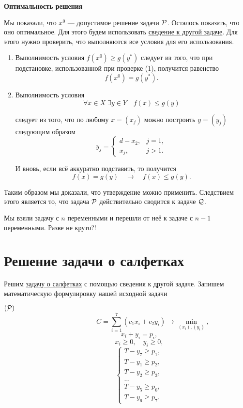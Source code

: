 \bigskip

\textbf{Оптимальность решения}

Мы показали, что $x^0$ --- допустимое решение задачи $\P$. Осталось показать, что оно оптимальное. Для этого будем использовать \hyperref[fact:reduction_to_other_problem]{сведение к другой задаче}. Для этого нужно проверить, что выполняются все условия для его использования.

\begin{enumerate}[nosep]
	\item Выполнимость условия $f(x^0) \ge g(y^*)$ следует из того, что при подстановке, использованной при проверке (1), получится равенство
	\[
	f(x^0) = g(y^*).
	\]
	
	\item Выполнимость условия
	\[
	\forall x \in X \; \exists y \in Y \quad f(x) \le g(y)
	\]
	
	следует из того, что по любому $x = (x_j)$ можно построить $y = (y_j)$ следующим образом
	\[
	y_j = \begin{cases}
		d - x_2,& j = 1, \\
		x_j,& j > 1.
	\end{cases}
	\]
	
	И вновь, если всё аккуратно подставить, то получится
	\[
	f(x) = g(y) \quad \rightarrow \quad f(x) \le g(y).
	\]
\end{enumerate}

Таким образом мы доказали, что утверждение можно применить. Следствием этого является то, что задача $\P$ действительно сводится к задаче $\Q$.

Мы взяли задачу с $n$ переменными и перешли от неё к задаче с $n-1$ переменными. Разве не круто?!

\section{Решение задачи о салфетках}


Решим \hyperref[pr:napkins]{задачу о салфетках} с помощью сведения к другой задаче. Запишем математическую формулировку нашей исходной задачи

$(\P) $
\[
\qquad\qquad\qquad\qquad C = \sum_{i=1}^7 (c_1 x_i + c_2 y_i) \to \min_{(x_i), (y_i)},
\]
\[
\qquad\qquad x_i + y_i = p_i,
\]
\[
\qquad\qquad x_i \ge 0, \quad y_i \ge 0,
\]
\[
\qquad\qquad\begin{cases}
	T - y_7 \ge p_1, \\
	T - y_1 \ge p_2, \\
	T - y_2 \ge p_3, \\
	\dots \\
	T - y_5 \ge p_6, \\
	T - y_6 \ge p_7.
\end{cases}
\]

